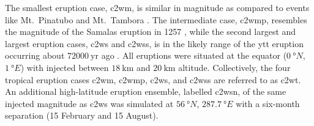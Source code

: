 \documentclass{ametsocV6.1}
\newcommand{\iso}[1][i]{{#1}njected \ce{SO2}}
\begin{document}
The smallest eruption case, \gls{c2wm}, is similar in magnitude as compared to events
like Mt.\ Pinatubo
\citep[\(\sim10\)--\(\SI{20}{\tera\gram(\ce{SO2})}\);][]{timmreck2018} and Mt.\ Tambora
\citep[\(\sim\SI{56.2}{\tera\gram(\ce{SO2})}\);][]{zanchettin2016}. The intermediate
case, \gls{c2wmp}, resembles the magnitude of the Samalas eruption in 1257
\citep[\(\sim{144}\)--\(\SI{170}{\tera\gram(\ce{SO2})}\);][]{vidal2016}, while the
second largest and largest eruption cases, \gls{c2ws} and \gls{c2wss}, is in the likely
range of the \gls{ytt} eruption occurring about \(\SI{72000}{\mathrm{yr}}\) ago
\citep[\(100\)--\(\SI{10000}{\tera\gram(\ce{SO2})}\);][]{jones2005}. All eruptions were
situated at the equator (\(\SI{0}{\degree N}\), \(\SI{1}{\degree E}\)) with 
injected between \(\SI{18}{\kilo\meter}\) and \(\SI{20}{\kilo\meter}\) altitude.
Collectively, the four tropical eruption cases \gls{c2wm}, \gls{c2wmp}, \gls{c2ws}, and
\gls{c2wss} are referred to as \gls{c2wt}. An additional high-latitude eruption
ensemble, labelled \gls{c2wsn}, of the same \iso{} magnitude as \gls{c2ws} was simulated
at \(\SI{56}{\degree N}\), \(\SI{287.7}{\degree E}\) with a six-month separation (15
February and 15 August).
\end{document}

